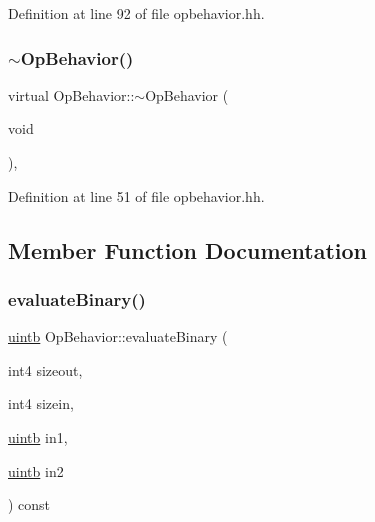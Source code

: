 Definition at line 92 of file opbehavior.\+hh.

\mbox{\label{class_op_behavior_ab1a0bf0919773aa789b1e5e7037f2325}} 
\subsubsection{\texorpdfstring{$\sim$OpBehavior()}{~OpBehavior()}}
{\footnotesize\ttfamily virtual Op\+Behavior\+::$\sim$\+Op\+Behavior (\begin{DoxyParamCaption}\item[{void}]{ }\end{DoxyParamCaption})\hspace{0.3cm}{\ttfamily [inline]}, {\ttfamily [virtual]}}



Definition at line 51 of file opbehavior.\+hh.



\subsection{Member Function Documentation}
\mbox{\label{class_op_behavior_aeeed3af7aa35264b31a1f182884214a9}} 
\subsubsection{\texorpdfstring{evaluateBinary()}{evaluateBinary()}}
{\footnotesize\ttfamily \mbox{\hyperlink{types_8h_a2db313c5d32a12b01d26ac9b3bca178f}{uintb}} Op\+Behavior\+::evaluate\+Binary (\begin{DoxyParamCaption}\item[{int4}]{sizeout,  }\item[{int4}]{sizein,  }\item[{\mbox{\hyperlink{types_8h_a2db313c5d32a12b01d26ac9b3bca178f}{uintb}}}]{in1,  }\item[{\mbox{\hyperlink{types_8h_a2db313c5d32a12b01d26ac9b3bca178f}{uintb}}}]{in2 }\end{DoxyParamCaption}) const\hspace{0.3cm}{\ttfamily [virtual]}}



